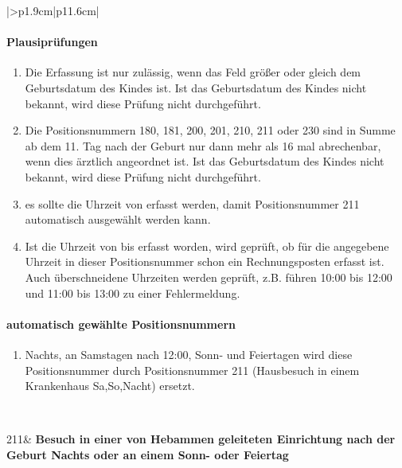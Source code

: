 \begin{mpsupertabular}{|>{\centering}p{1.9cm}|p{11.6cm}|}
\paragraph{Plausiprüfungen}
\begin{enumerate}
\item
Die Erfassung ist nur zulässig, wenn das Feld  größer 
oder gleich dem Geburtsdatum des Kindes ist. Ist das Geburtsdatum des
Kindes nicht bekannt, wird diese Prüfung nicht durchgeführt.
\item
Die Positionsnummern 180, 181, 200, 201, 210, 211 oder 230 sind in Summe 
ab dem 11. Tag nach der Geburt nur dann mehr 
als 16 mal abrechenbar, wenn dies ärztlich angeordnet ist.
Ist das Geburtsdatum des
Kindes nicht bekannt, wird diese Prüfung nicht durchgeführt.
\item
es sollte die Uhrzeit von erfasst werden, damit Positionsnummer 211 
automatisch ausgewählt werden kann.
\item
Ist die Uhrzeit von bis erfasst worden, wird geprüft, ob für die angegebene 
Uhrzeit in dieser Positionsnummer
schon ein Rechnungsposten erfasst ist. Auch überschneidene Uhrzeiten
werden geprüft, z.B. führen 10:00 bis 12:00 und 11:00 bis 13:00 zu einer
Fehlermeldung.
\end{enumerate}
\paragraph{automatisch gewählte Positionsnummern}
\begin{enumerate}
\item
Nachts, an Samstagen nach 12:00, Sonn- und Feiertagen 
wird diese Positionsnummer durch Positionsnummer
211 (Hausbesuch in einem Krankenhaus Sa,So,Nacht) ersetzt.
\end{enumerate}
\\ \hline


211&
\textbf{Besuch in einer von Hebammen geleiteten Einrichtung
nach der Geburt Nachts oder an einem Sonn- oder Feiertag}

\end{mpsupertabular}
